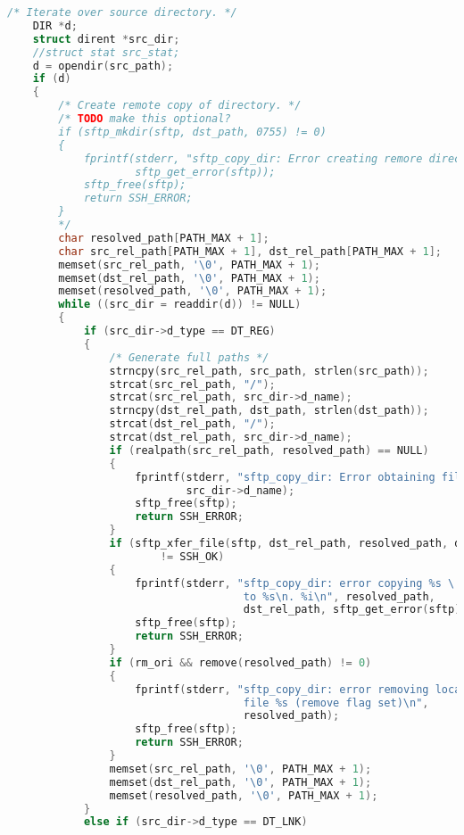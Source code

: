 \begin{lstlisting}[language=C,caption={Signature and schematic implementation of remote execution methods.},label={code:libssh}]
    /* Iterate over source directory. */
    DIR *d;
    struct dirent *src_dir;
    //struct stat src_stat;
    d = opendir(src_path);
    if (d)
    {
        /* Create remote copy of directory. */
        /* TODO make this optional?
        if (sftp_mkdir(sftp, dst_path, 0755) != 0)
        {
            fprintf(stderr, "sftp_copy_dir: Error creating remore directory %d\n",
                    sftp_get_error(sftp));
            sftp_free(sftp);
            return SSH_ERROR;
        }
        */
        char resolved_path[PATH_MAX + 1];
        char src_rel_path[PATH_MAX + 1], dst_rel_path[PATH_MAX + 1];
        memset(src_rel_path, '\0', PATH_MAX + 1);
        memset(dst_rel_path, '\0', PATH_MAX + 1);
        memset(resolved_path, '\0', PATH_MAX + 1);
        while ((src_dir = readdir(d)) != NULL)
        {
            if (src_dir->d_type == DT_REG)
            {
                /* Generate full paths */
                strncpy(src_rel_path, src_path, strlen(src_path));
                strcat(src_rel_path, "/");
                strcat(src_rel_path, src_dir->d_name);
                strncpy(dst_rel_path, dst_path, strlen(dst_path));
                strcat(dst_rel_path, "/");
                strcat(dst_rel_path, src_dir->d_name);
                if (realpath(src_rel_path, resolved_path) == NULL)
                {
                    fprintf(stderr, "sftp_copy_dir: Error obtaining file's real path: %s\n",
                            src_dir->d_name);
                    sftp_free(sftp);
                    return SSH_ERROR;
                }
                if (sftp_xfer_file(sftp, dst_rel_path, resolved_path, dir_size)
                        != SSH_OK)
                {
                    fprintf(stderr, "sftp_copy_dir: error copying %s \
                                     to %s\n. %i\n", resolved_path,
                                     dst_rel_path, sftp_get_error(sftp));
                    sftp_free(sftp);
                    return SSH_ERROR;
                }
                if (rm_ori && remove(resolved_path) != 0)
                {
                    fprintf(stderr, "sftp_copy_dir: error removing local \
                                     file %s (remove flag set)\n",
                                     resolved_path);
                    sftp_free(sftp);
                    return SSH_ERROR;
                }
                memset(src_rel_path, '\0', PATH_MAX + 1);
                memset(dst_rel_path, '\0', PATH_MAX + 1);
                memset(resolved_path, '\0', PATH_MAX + 1);
            }
            else if (src_dir->d_type == DT_LNK)

\end{lstlisting}
